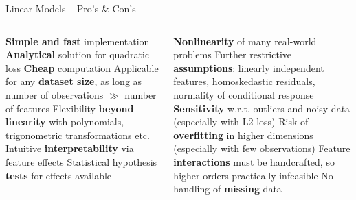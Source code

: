 \begin{frame}{Linear Models -- Pro's \& Con's}



\begin{columns}[onlytextwidth]
  \begin{column}{0.5\textwidth}
    
    \begin{procon}
      \setlength{\itemsep}{1pt}
      \setlength{\parskip}{1pt}
      \positem \textbf{Simple and fast} implementation
      \positem \textbf{Analytical} solution for quadratic loss
      \positem \textbf{Cheap} computation
      \positem Applicable for any \textbf{dataset size}, as long as number of 
      observations $\gg$ number of features
      \positem Flexibility \textbf{beyond linearity} with polynomials, 
      trigonometric transformations etc.
      \positem Intuitive \textbf{interpretability} via feature effects
      \positem Statistical hypothesis \textbf{tests} for effects available
    \end{procon}
  \end{column}

  \begin{column}{0.5\textwidth}
    
    \begin{itemize}
      \negitem \textbf{Nonlinearity} of many real-world problems
      \negitem Further restrictive \textbf{assumptions}: linearly independent 
      features, homoskedastic residuals, normality of conditional response 
      \negitem \textbf{Sensitivity} w.r.t. outliers and noisy data (especially 
      with L2 loss)
      \negitem Risk of \textbf{overfitting} in higher dimensions (especially 
      with few observations) 
      \negitem Feature \textbf{interactions} must be handcrafted, so higher
      orders practically infeasible
      \negitem No handling of \textbf{missing} data
    \end{itemize}
  \end{column}
\end{columns}

\vfill

\small


\end{frame}